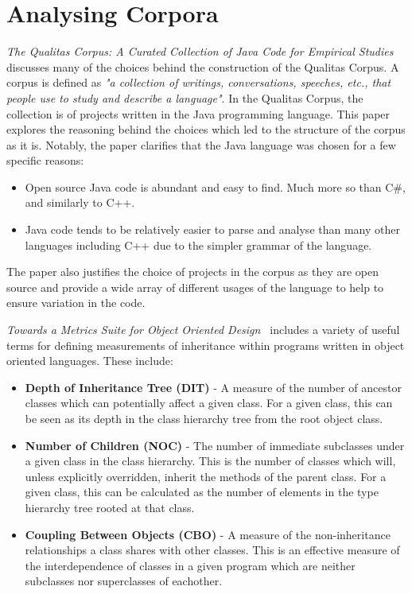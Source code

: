 \section{Analysing Corpora}
\textit{The Qualitas Corpus: A Curated Collection of Java Code for Empirical Studies~\cite{QualitasCorpus}} discusses many of the choices behind the construction of the Qualitas Corpus. A corpus is defined as \textit{"a collection of writings, conversations, speeches, etc., that people use to study and describe a language"}. In the Qualitas Corpus, the collection is of projects written in the Java programming language. This paper explores the reasoning behind the choices which led to the structure of the corpus as it is. Notably, the paper clarifies that the Java language was chosen for a few specific reasons:
\begin{itemize}
	\item Open source Java code is abundant and easy to find. Much more so than C\#, and similarly to C++.
	\item Java code tends to be relatively easier to parse and analyse than many other languages including C++ due to the simpler grammar of the language.
\end{itemize}
The paper also justifies the choice of projects in the corpus as they are open source and provide a wide array of different usages of the language to help to ensure variation in the code.
\newline

\textit{Towards a Metrics Suite for Object Oriented Design~\cite{MetricsSuite}} includes a variety of useful terms for defining measurements of inheritance within programs written in object oriented languages. These include:
\begin{itemize}
	\item \textbf{Depth of Inheritance Tree (DIT)} - A measure of the number of ancestor classes which can potentially affect a given class. For a given class, this can be seen as its depth in the class hierarchy tree from the root object class.
	\item \textbf{Number of Children (NOC)} - The number of immediate subclasses under a given class in the class hierarchy. This is the number of classes which will, unless explicitly overridden, inherit the methods of the parent class. For a given class, this can be calculated as the number of elements in the type hierarchy tree rooted at that class.
	\item \textbf{Coupling Between Objects (CBO)} - A measure of the non-inheritance relationships a class shares with other classes. This is an effective measure of the interdependence of classes in a given program which are neither subclasses nor superclasses of eachother.
\end{itemize}

